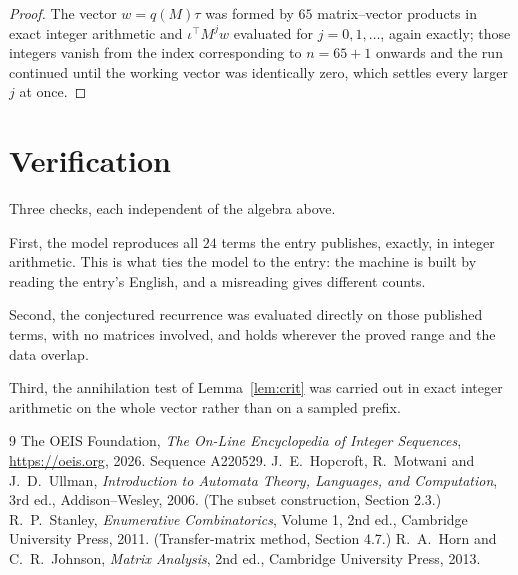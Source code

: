 \documentclass[11pt,a4paper]{article}
\theoremstyle{plain}
\theoremstyle{definition}
\begin{document}
\begin{proof}
The vector $w=q(M)\tau$ was formed by $65$ matrix--vector products in exact integer
arithmetic and $\iota^{\!\top}M^{j}w$ evaluated for $j=0,1,\dots$, again exactly; those
integers vanish from the index corresponding to $n=65+1$ onwards and the run continued
until the working vector was identically zero, which settles every larger $j$ at once.
\end{proof}

\section{Verification}

Three checks, each independent of the algebra above.

First, the model reproduces all $24$ terms the entry publishes, exactly, in integer
arithmetic. This is what ties the model to the entry: the machine is built by reading the
entry's English, and a misreading gives different counts.

Second, the conjectured recurrence was evaluated directly on those published terms, with no
matrices involved, and holds wherever the proved range and the data overlap.

Third, the annihilation test of Lemma~\ref{lem:crit} was carried out in exact integer
arithmetic on the whole vector rather than on a sampled prefix.

\begin{thebibliography}{9}
 The OEIS Foundation, \emph{The On-Line Encyclopedia of Integer
Sequences}, \url{https://oeis.org}, 2026. Sequence A220529.
 J.~E.~Hopcroft, R.~Motwani and J.~D.~Ullman, \emph{Introduction to Automata
Theory, Languages, and Computation}, 3rd ed., Addison--Wesley, 2006. (The subset
construction, Section 2.3.)
 R.~P.~Stanley, \emph{Enumerative Combinatorics}, Volume 1, 2nd ed.,
Cambridge University Press, 2011. (Transfer-matrix method, Section 4.7.)
 R.~A.~Horn and C.~R.~Johnson, \emph{Matrix Analysis}, 2nd ed., Cambridge
University Press, 2013.
\end{thebibliography}
\end{document}
